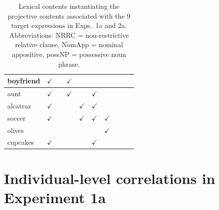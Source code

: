 \documentclass[11pt,fleqn]{article}
\newcommand{\6}{\mbox{$[\hspace*{-.6mm}[$}}
\newcommand{\9}{\mbox{$]\hspace*{-.6mm}]$}}
\begin{document}
\begin{table}[h!]
\begin{center}
\begin{tabular}{l|ccccccccc}
boyfriend & $\checkmark$ & & $\checkmark$ & & & & & &  \\

\hline

aunt & $\checkmark$ & & $\checkmark$ & & $\checkmark$ & & & &  \\

\hline

alcatraz & $\checkmark$ & & & $\checkmark$ & $\checkmark$ & & & &  \\

\hline

soccer & $\checkmark$ & & & $\checkmark$ & $\checkmark$ & $\checkmark$ & & &  \\

\hline

olives & & & & & & $\checkmark$ & & &  \\

\hline

cupcakes & $\checkmark$ & & & & $\checkmark$ & & & &  \\

\hline

\end{tabular}
\end{center}
\caption{Lexical contents instantiating the projective contents associated with the 9 target expressions in Exps.~1a and 2a. Abbreviations: NRRC = non-restrictive relative clause, NomApp = nominal appositive, possNP = possessive noun phrase.}\label{t-trigger-content-pairs}
\end{table}

\section{Individual-level correlations in Experiment 1a}\label{a-corr}
\end{document}
